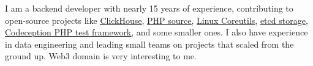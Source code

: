 I am a backend developer with nearly 15 years of experience, contributing to
open-source projects like
\href{https://github.com/ClickHouse/ClickHouse/pulls?q=is\%3Apr+is\%3Aclosed+author\%3AGSokol}{\underline{ClickHouse}},
\href{https://github.com/php/php-src/pulls?q=is\%3Apr+is\%3Aclosed+author\%3AGSokol}{\underline{PHP source}},
\href{https://github.com/coreutils/coreutils/commits?author=GSokol}{\underline{Linux Coreutils}},
\href{https://github.com/etcd-io/etcd/pulls?q=is\%3Apr+is\%3Aclosed+author\%3AGSokol}{\underline{etcd storage}},
\href{https://github.com/Codeception/Codeception/pulls?q=is\%3Apr+is\%3Aclosed+author\%3AGSokol}{\underline{Codeception PHP test framework}},
and some smaller ones. I also have experience in data engineering and leading
small teams on projects that scaled from the ground up. Web3 domain is very
interesting to me.
